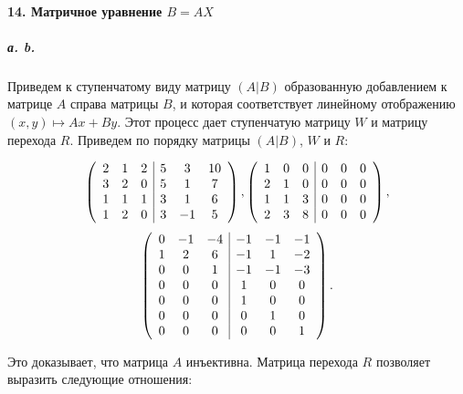 {\paragraph{14. Матричное уравнение $B = AX$}

\subparagraph{а. b.} Приведем к ступенчатому виду матрицу $(A | B)$ образованную добавлением к матрице $A$ справа матрицы $B$, и которая соответствует линейному отображению $(x, y) \mapsto Ax+By$. Этот процесс дает ступенчатую матрицу $W$ и матрицу перехода $R$. Приведем по порядку матрицы
$(A | B)$, $W$ и $R$:

\[ \left( \begin{array}{cccccc}
2 & 1 & 2 & \multicolumn{1}{|c}{5} & 3 & 10 \\
3 & 2 & 0 & \multicolumn{1}{|c}{5} & 1 & 7 \\
1 & 1 & 1 & \multicolumn{1}{|c}{3} & 1 & 6 \\
1 & 2 & 0 & \multicolumn{1}{|c}{3} & -1 & 5
\end{array} \right),
\left( \begin{array}{cccccc}
1 & 0 & 0 & \multicolumn{1}{|c}{0} & 0 & 0 \\
2 & 1 & 0 & \multicolumn{1}{|c}{0} & 0 & 0 \\
1 & 1 & 3 & \multicolumn{1}{|c}{0} & 0 & 0 \\
2 & 3 & 8 & \multicolumn{1}{|c}{0} & 0 & 0
\end{array} \right),\]
\[
\left( \begin{array}{cccccc}
0 & -1 & -4 & \multicolumn{1}{|c}{-1} & -1 & -1 \\
1 & 2 & 6 & \multicolumn{1}{|c}{-1} & 1 & -2 \\
0 & 0 & 1 & \multicolumn{1}{|c}{-1} & -1 & -3 \\
0 & 0 & 0 & \multicolumn{1}{|c}{1} & 0 & 0 \\
0 & 0 & 0 & \multicolumn{1}{|c}{1} & 0 & 0 \\
0 & 0 & 0 & \multicolumn{1}{|c}{0} & 1 & 0 \\
0 & 0 & 0 & \multicolumn{1}{|c}{0} & 0 & 1
\end{array} \right). \]

\noindent Это доказывает, что матрица $A$ инъективна. Матрица перехода $R$ позволяет выразить следующие отношения:

}
